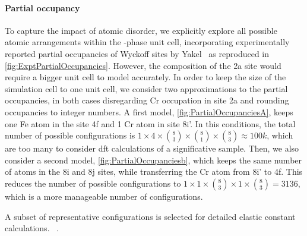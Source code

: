 \documentclass[superscriptaddress, 12pt]{revtex4-2}%
\begin{document}
\paragraph{Partial occupancy} To capture the impact of atomic disorder, we explicitly explore all possible atomic
arrangements within the \textsigma-phase unit cell, incorporating experimentally reported partial occupancies of Wyckoff
sites by Yakel~\cite{yakel_atom_1983} as reproduced in \autoref{fig:ExptPartialOccupancies}. However, the composition of
the 2a site would require a bigger unit cell to model accurately.  In order to keep the size of the simulation cell to
one unit cell, we consider two approximations to the partial occupancies, in both cases disregarding Cr occupation in
site 2a and rounding occupancies to integer numbers.  A first model, \autoref{fig:PartialOccupanciesA}, keeps one Fe
atom in the site 4f and 1 Cr atom in site 8i'.  In this conditions, the total number of possible configurations is $ 1
\times 4 \times \binom{8}{3}\times \binom{8}{1} \times \binom {8}{3} \approx 100k $, which are too many to consider dft
calculations of a significative sample. Then, we also consider a second model, \autoref{fig:PartialOccupanciesb}, which
keeps the same number of atoms in the 8i and 8j sites, while transferring the Cr atom from 8i' to 4f. This reduces the
number of possible configurations to $ 1 \times 1 \times \binom{8}{3}\times 1 \times \binom {8}{3} = 3136 $, which is a
more manageable number of configurations.

A subset of representative configurations is selected for detailed elastic constant
calculations. ~\cite{golesorkhtabar_elastic_2013}.
\end{document}
